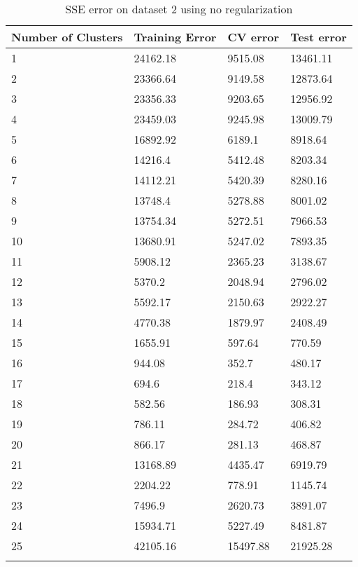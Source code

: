 \begin{center}
\begin{longtable}{l l l l}
\hline
\hline
\textbf{Number of Clusters} & \textbf{Training Error} & \textbf{CV error} & \textbf{Test error}\\
\hline
\hline
1 & 24162.18 & 9515.08 & 13461.11 \\
2 & 23366.64 & 9149.58 & 12873.64 \\
3 & 23356.33 & 9203.65 & 12956.92 \\
4 & 23459.03 & 9245.98 & 13009.79 \\
5 & 16892.92 & 6189.1 & 8918.64 \\
6 & 14216.4 & 5412.48 & 8203.34 \\
7 & 14112.21 & 5420.39 & 8280.16 \\
8 & 13748.4 & 5278.88 & 8001.02 \\
9 & 13754.34 & 5272.51 & 7966.53 \\
10 & 13680.91 & 5247.02 & 7893.35 \\
11 & 5908.12 & 2365.23 & 3138.67 \\
12 & 5370.2 & 2048.94 & 2796.02 \\
13 & 5592.17 & 2150.63 & 2922.27 \\
14 & 4770.38 & 1879.97 & 2408.49 \\
15 & 1655.91 & 597.64 & 770.59 \\
16 & 944.08 & 352.7 & 480.17 \\
17 & 694.6 & 218.4 & 343.12 \\
18 & 582.56 & 186.93 & 308.31 \\
19 & 786.11 & 284.72 & 406.82 \\
20 & 866.17 & 281.13 & 468.87 \\
21 & 13168.89 & 4435.47 & 6919.79 \\
22 & 2204.22 & 778.91 & 1145.74 \\
23 & 7496.9 & 2620.73 & 3891.07 \\
24 & 15934.71 & 5227.49 & 8481.87 \\
25 & 42105.16 & 15497.88 & 21925.28 \\
\hline
\caption{SSE error on dataset 2 using no regularization}
\label{table:erms_ds2_noreg_gaus}
\end{longtable}
\end{center}